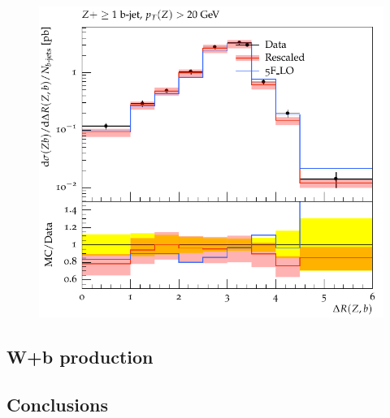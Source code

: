 \documentclass[11pt]{cernrep} \usepackage{graphicx,epsfig} 
\begin{document}
\begin{figure}[htbp]
   \includegraphics[scale=0.5]{figs/zbb/d13-x01-y01_rescaled.pdf} 
\end{figure}

\subsection{W+b production}

\subsection{Conclusions}


\end{document}
